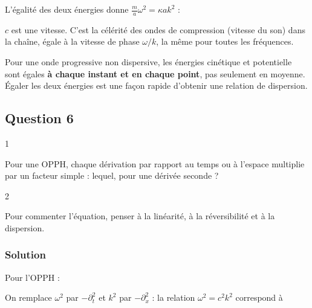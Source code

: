 \documentclass[11pt,a4paper]{article}
\newcommand{\equationajustee}[1]{%
  \sbox{\boiteequation}{$\displaystyle #1$}%
  \ifdim\wd\boiteequation>\linewidth
    \[\resizebox{\linewidth}{!}{\usebox{\boiteequation}}\]%
  \else
    \[#1\]%
  \fi}
\begin{document}
L'égalité des deux énergies donne \(\frac{m}{a}\omega^2=\kappa ak^2\) :

\equationajustee{\boxed{\omega^2=k^2c^2}}

\equationajustee{\boxed{c=a\sqrt{\frac{\kappa}{m}}}}

\(c\) est une vitesse. C'est la célérité des ondes de compression (vitesse du son) dans la chaîne, égale à la vitesse de phase \(\omega/k\), la même pour toutes les fréquences.

\begin{methode}

Pour une onde progressive non dispersive, les énergies cinétique et potentielle sont égales \textbf{à chaque instant et en chaque point}, pas seulement en moyenne. Égaler les deux énergies est une façon rapide d'obtenir une relation de dispersion.

\end{methode}

\hypertarget{question-6}{%
\subsection{Question 6}\label{question-6}}

\begin{indication}{1}

Pour une OPPH, chaque dérivation par rapport au temps ou à l'espace multiplie par un facteur simple : lequel, pour une dérivée seconde ?

\end{indication}

\begin{indication}{2}

Pour commenter l'équation, penser à la linéarité, à la réversibilité et à la dispersion.

\end{indication}

\hypertarget{solution-5}{%
\subsubsection{Solution}\label{solution-5}}

Pour l'OPPH :

\equationajustee{\begin{aligned}\partial_t^2u&=-\omega^2u\\\partial_x^2u&=-k^2u\end{aligned}}

On remplace \(\omega^2\) par \(-\partial_t^2\) et \(k^2\) par \(-\partial_x^2\) : la relation \(\omega^2=c^2k^2\) correspond à
\end{document}
